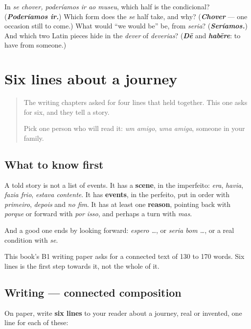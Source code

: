 \begin{tcolorbox}[breakable,colback=teal!4,colframe=teal!35!black,title={Before you move on}]
In \emph{se chover, poderíamos ir ao museu}, which half is the condicional? (\emph{\textbf{Poderíamos ir.}}) Which form does the \emph{se} half take, and why? (\emph{\textbf{Chover}} — one occasion still to come.) What would \textquotedblleft{}we would be\textquotedblright{} be, from \emph{seria}? (\emph{\textbf{Seríamos.}}) And which two Latin pieces hide in the \emph{dever} of \emph{deverias}? (\emph{\textbf{Dē}} and \emph{\textbf{habēre}}: to have from someone.)
\end{tcolorbox}
\section[(six lines)]{Six lines about a journey}

\label{lesson:PT-W268-seis-linhas}



\begin{quote}
The writing chapters asked for four lines that held together. This one asks for six, and they tell a story.

Pick one person who will read it: \emph{um amigo}, \emph{uma amiga}, someone in your family.
\end{quote}

\subsection*{What to know first}
A told story is not a list of events. It has a \textbf{scene}, in the imperfeito: \emph{era}, \emph{havia}, \emph{fazia frio}, \emph{estava contente}. It has \textbf{events}, in the perfeito, put in order with \emph{primeiro}, \emph{depois} and \emph{no fim}. It has at least one \textbf{reason}, pointing back with \emph{porque} or forward with \emph{por isso}, and perhaps a turn with \emph{mas}.

And a good one ends by looking forward: \emph{espero …}, or \emph{seria bom …}, or a real condition with \emph{se}.

This book's B1 writing paper asks for a connected text of 130 to 170 words. Six lines is the first step towards it, not the whole of it.

\subsection*{Writing — connected composition}
On paper, write \textbf{six lines} to your reader about a journey, real or invented, one line for each of these:

